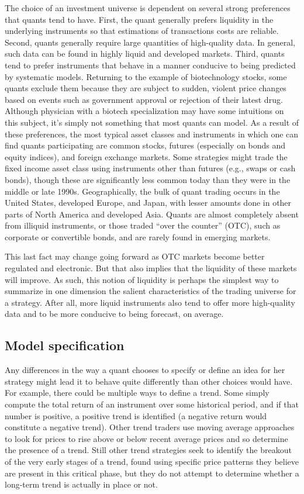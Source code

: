 \documentclass[11pt]{report}
\begin{document}
				The choice of an investment universe is dependent on several strong preferences that quants tend to have. First, the quant generally prefers liquidity in the underlying instruments so that estimations of transactions costs are reliable. Second, quants generally require large quantities of high-quality data. In general, such data can be found in highly liquid and developed markets. Third, quants tend to prefer instruments that behave in a manner conducive to being predicted by systematic models. Returning to the example of biotechnology stocks, some quants exclude them because they are subject to sudden, violent price changes based on events such as government approval or rejection of their latest drug. Although physician with a biotech specialization may have some intuitions on this subject, it’s simply not something that most quants can model. As a result of these preferences, the most typical asset classes and instruments in which one can find quants participating are common stocks, futures (especially on bonds and equity indices), and foreign exchange markets. Some strategies might trade the fixed income asset class using instruments other than futures (e.g., swaps or cash bonds), though these are significantly less common today than they were in the middle or late 1990s. Geographically, the bulk of quant trading occurs in the United States, developed Europe, and Japan, with lesser amounts done in other parts of North America and developed Asia. Quants are almost completely absent from illiquid instruments, or those traded ``over the counter'' (OTC), such as corporate or convertible bonds, and are rarely found in emerging markets.

				This last fact may change going forward as OTC markets become better regulated and electronic. But that also implies that the liquidity of these markets will improve. As such, this notion of liquidity is perhaps the simplest way to summarize in one dimension the salient characteristics of the trading universe for a strategy. After all, more liquid instruments also tend to offer more high-quality data and to be more conducive to being forecast, on average.

			\subsection{Model specification}

				Any differences in the way a quant chooses to specify or define an idea for her strategy might lead it to behave quite differently than other choices would have. For example, there could be multiple ways to define a trend. Some simply compute the total return of an instrument over some historical period, and if that number is positive, a positive trend is identified (a negative return would constitute a negative trend). Other trend traders use moving average approaches to look for prices to rise above or below recent average prices and so determine the presence of a trend. Still other trend strategies seek to identify the breakout of the very early stages of a trend, found using specific price patterns they believe are present in this critical phase, but they do not attempt to determine whether a long-term trend is actually in place or not.
\end{document}
